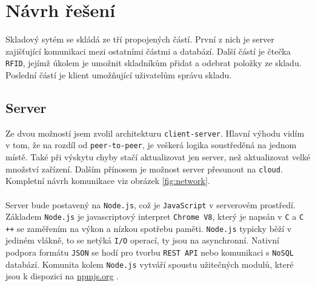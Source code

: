 \documentclass[czech,BP]{thesiskiv}
\begin{document}
	
	
	
	
	
	
	
	
	
	
	
	
	
	
	
	
	
	
	
	
	
	
	
	
	
	
	
	
	
	
	
	
	
\chapter{Návrh řešení}

Skladový sytém se skládá ze tří propojených částí. 
První z nich je server zajišťující komunikaci mezi ostatními částmi a databází.  
Další částí je čtečka \texttt{RFID}, jejímž úkolem je umožnit skladníkům přidat a odebrat položky ze skladu.  
Poslední částí je klient umožňující uživatelům správu skladu.

		\section{Server} 
			Ze dvou možností jsem zvolil architekturu \texttt{client-server}. Hlavní výhodu vidím v tom, že na rozdíl od \texttt{peer-to-peer}, je veškerá logika soustředěná na jednom místě. Také při výskytu chyby stačí aktualizovat jen server, než aktualizovat velké množství zařízení.
			Dalším přínosem je možnost server přesunout na \texttt{cloud}. 
			Kompletní návrh komunikace viz obrázek \ref{fig:network}.
			\\\\
			Server bude postavený na \texttt{Node.js}\cite{tilkov2010node}, což je \texttt{JavaScript} v serverovém prostředí. Základem \texttt{Node.js} je javascriptový interpret \texttt{Chrome V8}, který je napsán v \texttt{C} a \texttt{C ++} se zaměřením na výkon a nízkou spotřebu paměti. \texttt{Node.js} typicky běží v jediném vlákně, to se netýká \texttt{I/O} operací, ty jsou na asynchronní. Nativní podpora formátu \texttt{JSON} se hodí pro tvorbu \texttt{REST API} nebo komunikaci s \texttt{NoSQL} databází. Komunita kolem \texttt{Node.js} vytváří spoustu užitečných modulů, které jsou k dispozici na \url{npmjs.org} \cite{tilkov2010node}.
				
\end{document}
